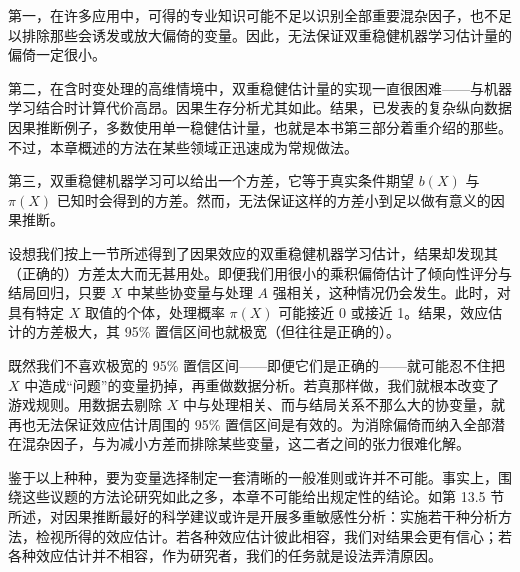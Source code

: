第一，在许多应用中，可得的专业知识可能不足以识别全部重要混杂因子，也不足以排除那些会诱发或放大偏倚的变量。因此，无法保证双重稳健机器学习估计量的偏倚一定很小。

第二，在含时变处理的高维情境中，双重稳健估计量的实现一直很困难——与机器学习结合时计算代价高昂。因果生存分析尤其如此。结果，已发表的复杂纵向数据因果推断例子，多数使用单一稳健估计量，也就是本书第三部分着重介绍的那些。不过，本章概述的方法在某些领域正迅速成为常规做法。

第三，双重稳健机器学习可以给出一个方差，它等于真实条件期望 $b(X)$ 与 $\pi(X)$ 已知时会得到的方差。然而，无法保证这样的方差小到足以做有意义的因果推断。

设想我们按上一节所述得到了因果效应的双重稳健机器学习估计，结果却发现其（正确的）方差太大而无甚用处。即便我们用很小的乘积偏倚估计了倾向性评分与结局回归，只要 $X$ 中某些协变量与处理 $A$ 强相关，这种情况仍会发生。此时，对具有特定 $X$ 取值的个体，处理概率 $\pi(X)$ 可能接近 0 或接近 1。结果，效应估计的方差极大，其 95\% 置信区间也就极宽（但往往是正确的）。

既然我们不喜欢极宽的 95\% 置信区间——即便它们是正确的——就可能忍不住把 $X$ 中造成“问题”的变量扔掉，再重做数据分析。若真那样做，我们就根本改变了游戏规则。用数据去剔除 $X$ 中与处理相关、而与结局关系不那么大的协变量，就再也无法保证效应估计周围的 95\% 置信区间是有效的。为消除偏倚而纳入全部潜在混杂因子，与为减小方差而排除某些变量，这二者之间的张力很难化解。

鉴于以上种种，要为变量选择制定一套清晰的一般准则或许并不可能。事实上，围绕这些议题的方法论研究如此之多，本章不可能给出规定性的结论。如第 13.5 节所述，对因果推断最好的科学建议或许是开展多重敏感性分析：实施若干种分析方法，检视所得的效应估计。若各种效应估计彼此相容，我们对结果会更有信心；若各种效应估计并不相容，作为研究者，我们的任务就是设法弄清原因。

